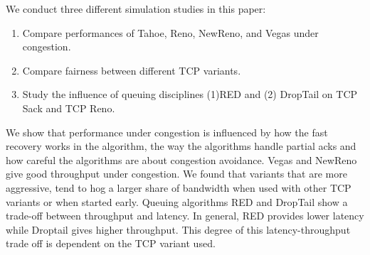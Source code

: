  We conduct three different simulation studies in this paper:
 \begin{enumerate}
 \item Compare performances of Tahoe, Reno, NewReno, and Vegas under congestion. 
 \item Compare fairness between different TCP variants.
 \item Study the influence of queuing disciplines (1)RED and (2) DropTail on TCP Sack and TCP Reno.
 \end{enumerate}
 
We show that performance under congestion is influenced by how the fast recovery works in the algorithm, the way the algorithms handle partial acks and how careful the algorithms are about congestion avoidance. Vegas and NewReno give good throughput under congestion. We found that variants that are more aggressive, tend to hog a larger share of bandwidth when used with other TCP variants or when started early. Queuing algorithms RED and DropTail show a trade-off between throughput and latency. In general, RED provides lower latency while Droptail gives higher throughput. This degree of this latency-throughput trade off is dependent on the TCP variant used. 
